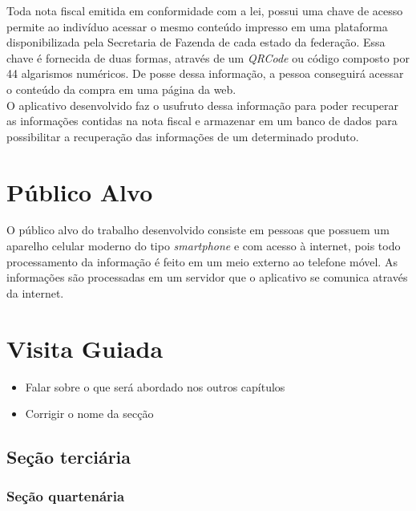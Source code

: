 Toda nota fiscal emitida em conformidade com a lei, possui uma chave de acesso permite ao indivíduo acessar o mesmo conteúdo impresso em uma plataforma disponibilizada pela Secretaria de Fazenda de cada estado da federação. Essa chave é fornecida de duas formas, através de um \textit{QRCode} ou código composto por 44 algarismos numéricos. De posse dessa informação, a pessoa conseguirá acessar o conteúdo da compra em uma página da web.\\

O aplicativo desenvolvido faz o usufruto dessa informação para poder recuperar as informações contidas na nota fiscal e armazenar em um banco de dados para possibilitar a recuperação das informações de um determinado produto.

\section{Público Alvo}

O público alvo do trabalho desenvolvido consiste em pessoas que possuem um aparelho celular moderno do tipo \textit{smartphone} e com acesso à internet, pois todo processamento da informação é feito em um meio externo ao telefone móvel. As informações são processadas em um servidor que o aplicativo se comunica através da internet.

\section{Visita Guiada}
\begin{itemize}
    \item Falar sobre o que será abordado nos outros capítulos
    \item Corrigir o nome da secção
\end{itemize}



\subsection{Seção terciária}

\subsubsection{Seção quartenária}

